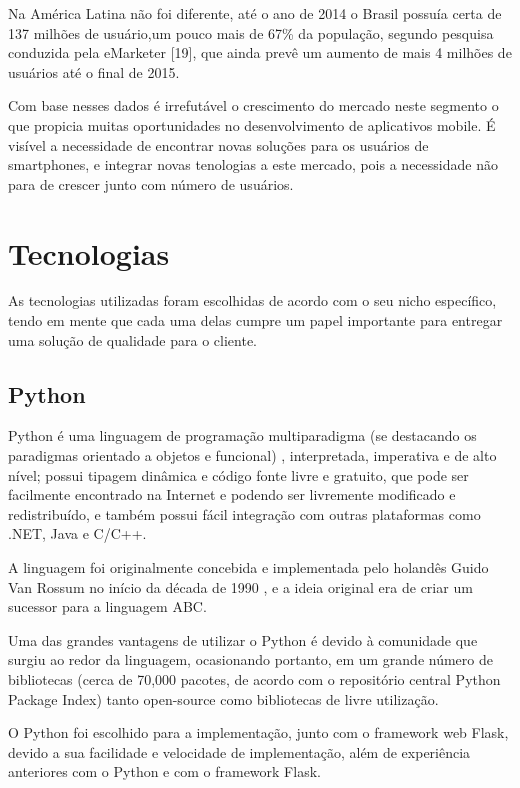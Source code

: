\documentclass[
	article,			%
	11pt,				%
	oneside,			%
	a4paper,			%
	english,			%
	brazil,				%
	sumario=tradicional
	]{abntex2}
\begin{document}
Na América Latina não foi diferente, até o ano de 2014 o Brasil possuía certa
de 137 milhões de usuário,um pouco mais de 67\% da população, segundo pesquisa
conduzida pela eMarketer [19], que ainda prevê um aumento de mais 4 milhões de
usuários até o final de 2015.

Com base nesses dados é irrefutável o crescimento do mercado neste segmento o
que propicia muitas oportunidades no desenvolvimento de aplicativos mobile.
É visível a necessidade de encontrar novas soluções para os usuários de
smartphones, e integrar novas tenologias a este mercado, pois a necessidade
 não para de crescer junto com  número de usuários.

\section{Tecnologias}

As tecnologias utilizadas foram escolhidas de acordo com o seu nicho específico,
tendo em mente que cada uma delas cumpre um papel importante para entregar uma
solução de qualidade para o cliente.

\subsection{Python}

Python é uma linguagem de programação multiparadigma (se destacando os paradigmas
orientado a objetos e funcional) , interpretada, imperativa e de alto nível;
possui tipagem dinâmica e código fonte livre \cite{pythonlicense} e gratuito, que pode ser
facilmente encontrado na Internet e podendo ser livremente modificado e
redistribuído, e também possui fácil integração com outras plataformas como
.NET, Java e C/C++.

A linguagem foi originalmente concebida e implementada pelo holandês Guido Van
Rossum no início da década de 1990 \cite{pythonlicense}, e a ideia original era de criar um sucessor para
a linguagem ABC.

Uma das grandes vantagens de utilizar o Python é devido à comunidade que surgiu
ao redor da linguagem, ocasionando portanto, em um grande número de bibliotecas
(cerca de 70,000 pacotes, de acordo com o repositório central Python Package
Index)\cite{pypi} tanto open-source como bibliotecas de livre utilização.

O Python foi escolhido para a implementação, junto com o framework web Flask,
devido a sua facilidade e velocidade de implementação, além de experiência
anteriores com o Python e com o framework Flask.
\end{document}
